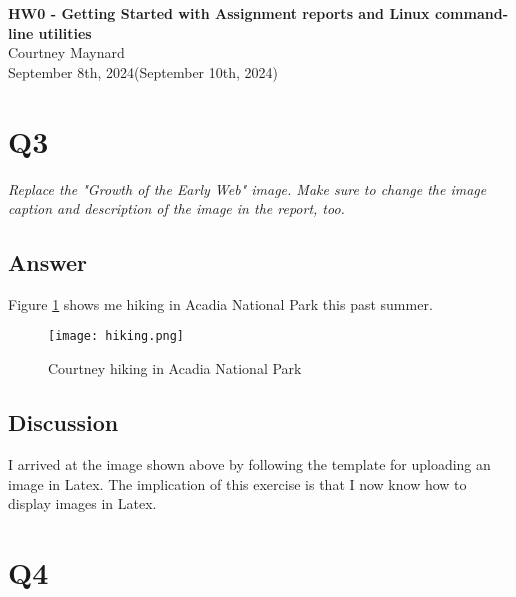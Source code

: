 \documentclass[12pt]{article}
\begin{document}
\begin{centering}
{\large\textbf{HW0 - Getting Started with Assignment reports and Linux command-line utilities}}\\ 
Courtney Maynard\\
September 8th, 2024(September 10th, 2024)\\
\end{centering}


\section*{Q3}

\emph{Replace the "Growth of the Early Web" image. Make sure to change the image caption and description of the image in the report, too.}

\subsection*{Answer}

Figure \ref{fig:courtney-hiking} shows me hiking in Acadia National Park this past summer.

\begin{figure}[h]
    \centering
    \texttt{[image: hiking.png]}
    \caption{Courtney hiking in Acadia National Park}
    \label{fig:courtney-hiking}
\end{figure}

\subsection*{Discussion}

I arrived at the image shown above by following the template for uploading an image in Latex. The implication of this exercise is that I now know how to display images in Latex.

\section*{Q4}
\end{document}
